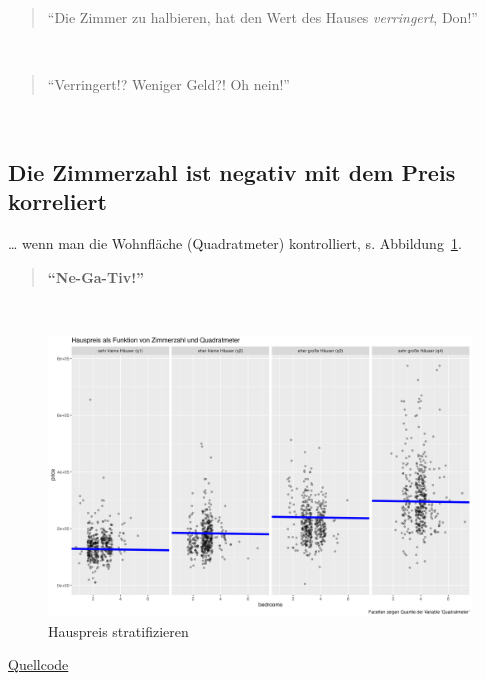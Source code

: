 \documentclass[
  a4paper,
  DIV=11]{scrreprt}
\theoremstyle{definition}
\theoremstyle{remark}
\begin{document}
\begin{quote}
``Die Zimmer zu halbieren, hat den Wert des Hauses \emph{verringert},
Don!''
\end{quote}

👩

\begin{quote}
``Verringert!? Weniger Geld?! Oh nein!''
\end{quote}

🧑

\hypertarget{die-zimmerzahl-ist-negativ-mit-dem-preis-korreliert}{%
\subsection{Die Zimmerzahl ist negativ mit dem Preis
korreliert}\label{die-zimmerzahl-ist-negativ-mit-dem-preis-korreliert}}

\ldots{} wenn man die Wohnfläche (Quadratmeter) kontrolliert, s.
Abbildung~\ref{fig-m2-negativ}.

\begin{quote}
\textbf{``Ne-Ga-Tiv!''}
\end{quote}

👩

\begin{figure}

{\centering \includegraphics{./img/hauspreis1.png}

}

\caption{\label{fig-m2-negativ}Hauspreis stratifizieren}

\end{figure}

\href{https://github.com/sebastiansauer/QM2-Folien/blob/main/Themen/children/Hauspreis-stratifizieren.Rmd}{Quellcode}
\end{document}
